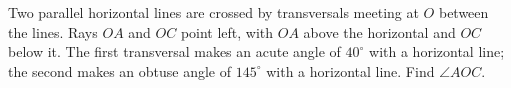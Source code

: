 Two parallel horizontal lines are crossed by transversals meeting at $O$ between the lines. Rays $OA$ and $OC$ point left, with $OA$ above the horizontal and $OC$ below it. The first transversal makes an acute angle of $40^\circ$ with a horizontal line; the second makes an obtuse angle of $145^\circ$ with a horizontal line. Find $\angle AOC$.
